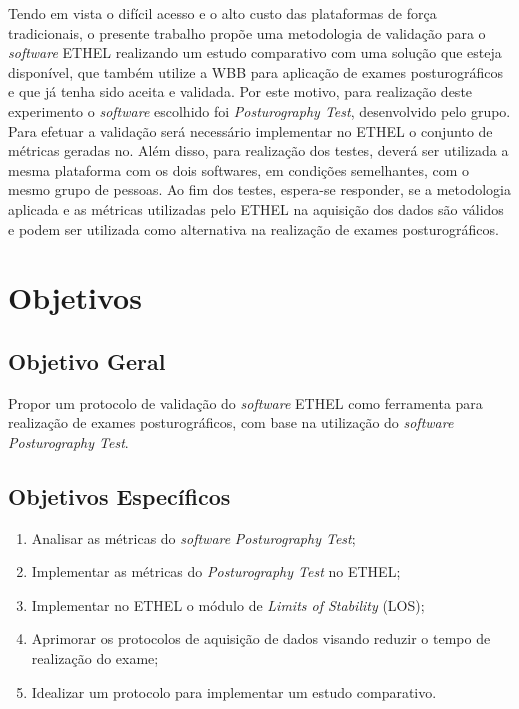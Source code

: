 Tendo em vista o difícil acesso e o alto custo das plataformas de força tradicionais, o presente trabalho propõe uma metodologia de validação para o \textit{software} ETHEL realizando um estudo comparativo com uma solução que esteja disponível, que também utilize a WBB para aplicação de exames posturográficos e que já tenha sido aceita e validada. Por este motivo, para realização deste experimento o \textit{software} escolhido foi \textit{Posturography Test}, desenvolvido pelo grupo. Para efetuar a validação será necessário implementar no ETHEL o conjunto de métricas geradas no. Além disso, para realização dos testes, deverá ser utilizada a mesma plataforma com os dois softwares, em condições semelhantes, com o mesmo grupo de pessoas.
Ao fim dos testes, espera-se responder, se a metodologia aplicada e as métricas utilizadas pelo ETHEL na aquisição dos dados são válidos e podem ser utilizada como alternativa na realização de exames posturográficos.

\section{Objetivos}

\subsection{ Objetivo Geral}
 Propor um protocolo de validação do \textit{software} ETHEL como ferramenta para realização de exames posturográficos, com base na utilização do \textit{software} \textit{Posturography Test}.

\subsection{Objetivos Específicos}
\begin{enumerate}
\item Analisar as métricas do \textit{software} \textit{Posturography Test};

\item Implementar as métricas do \textit{Posturography Test} no ETHEL;

\item Implementar no ETHEL o módulo de \textit{ Limits of Stability} (LOS);

\item Aprimorar os protocolos de aquisição de dados visando reduzir o tempo de realização do exame;

\item Idealizar um protocolo para implementar um estudo comparativo.

\end{enumerate}

